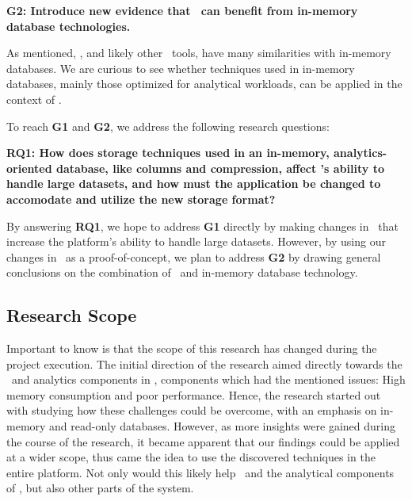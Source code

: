 \setlength{\leftskip}{1cm}

\textbf{G2: Introduce new evidence that \mde~can benefit from in-memory database technologies.}

\setlength{\leftskip}{0pt}

As mentioned, \gap, and likely other \mde~tools, have many similarities with in-memory databases. We are curious to see whether techniques used in in-memory databases, mainly those optimized for analytical workloads, can be applied in the context of \mde. 

To reach \textbf{G1} and \textbf{G2}, we address the following research questions:

\setlength{\leftskip}{1cm}

\textbf{RQ1: How does storage techniques used in an in-memory, analytics-oriented database, like columns and compression, affect \gap's ability to handle large datasets, and how must the application be changed to accomodate and utilize the new storage format?} 

\setlength{\leftskip}{0pt}

By answering \textbf{RQ1}, we hope to address \textbf{G1} directly by making changes in \gap~that increase the platform's ability to handle large datasets. However, by using our changes in \gap~as a proof-of-concept, we plan to address \textbf{G2} by drawing general conclusions on the combination of \mde~and in-memory database technology.

\subsection{Research Scope}
\label{sub:Research Scope}
Important to know is that the scope of this research has changed during the project execution. The initial direction of the research aimed directly towards the \bi~and analytics components in \gap, components which had the mentioned issues: High memory consumption and poor performance. Hence, the research started out with studying how these challenges could be overcome, with an emphasis on in-memory and read-only databases. However, as more insights were gained during the course of the research, it became apparent that our findings could be applied at a wider scope, thus came the idea to use the discovered techniques in the entire platform. Not only would this likely help \bi~and the analytical components of \gap, but also other parts of the system.

